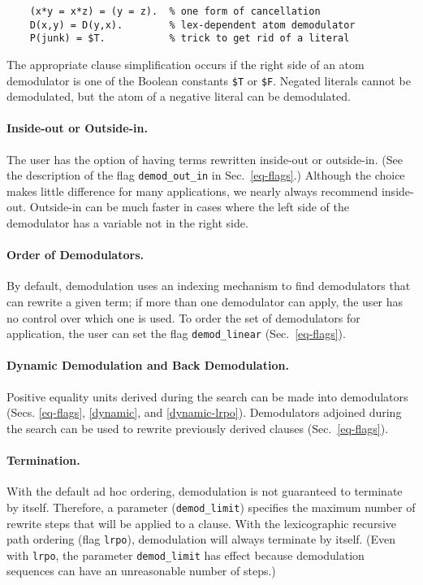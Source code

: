 \documentclass[11pt]{article}
\begin{document}
{\small
\begin{verbatim}
    (x*y = x*z) = (y = z).  % one form of cancellation
    D(x,y) = D(y,x).        % lex-dependent atom demodulator
    P(junk) = $T.           % trick to get rid of a literal
\end{verbatim}
}
\noindent
The appropriate clause simplification occurs if the right side of an
atom demodulator is one of the Boolean constants \verb:$T: or
\verb:$F:.  Negated literals cannot be demodulated, but the atom of a
negative literal can be demodulated.

\paragraph{Inside-out or Outside-in.}
The user has the option of having terms rewritten inside-out
or outside-in.  (See the description of the flag \verb:demod_out_in:
in Sec.~\ref{eq-flags}.)  Although the choice makes little
difference for many applications, we nearly always recommend inside-out.
Outside-in can be much faster in cases where the left side of the
demodulator has a variable not in the right side.

\paragraph{Order of Demodulators.}
By default, demodulation uses an indexing mechanism to find
demodulators that can rewrite a given term;  if more than one 
demodulator can apply, the user has no control over which
one is used.  To order the set of demodulators
for application, the user can set the flag \verb:demod_linear:
(Sec.~\ref{eq-flags}).

\paragraph{Dynamic Demodulation and Back Demodulation.}
Positive equality units derived during the search can be made into
demodulators (Secs. \ref{eq-flags}, \ref{dynamic}, and
\ref{dynamic-lrpo}).  Demodulators adjoined during the search can be
used to rewrite previously derived clauses (Sec.~\ref{eq-flags}).

\paragraph{Termination.}
With the default ad hoc ordering,
demodulation is not guaranteed to terminate by itself.  Therefore,
a parameter (\verb:demod_limit:) specifies the maximum
number of rewrite steps that will be applied to a clause.
With the lexicographic recursive path ordering (flag \verb:lrpo:),
demodulation will always terminate by itself.  (Even with \verb:lrpo:,
the parameter \verb:demod_limit: has effect because demodulation
sequences can have an unreasonable number of steps.)
\end{document}
